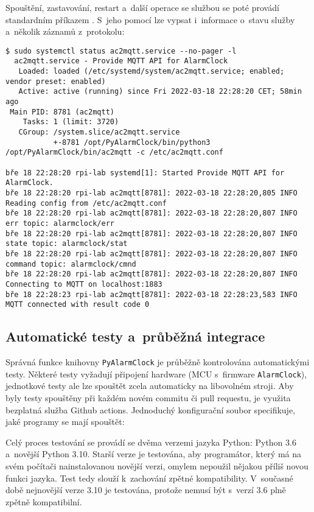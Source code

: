 Spouštění, zastavování, restart a~další operace se službou se poté provádí
standardním příkazem . S~jeho pomocí lze vypsat i~informace
o~stavu služby a~několik záznamů z~protokolu:
\begin{lstlisting}[style=terminal]
$ sudo systemctl status ac2mqtt.service --no-pager -l
  ac2mqtt.service - Provide MQTT API for AlarmClock
   Loaded: loaded (/etc/systemd/system/ac2mqtt.service; enabled; vendor preset: enabled)
   Active: active (running) since Fri 2022-03-18 22:28:20 CET; 58min ago
 Main PID: 8781 (ac2mqtt)
    Tasks: 1 (limit: 3720)
   CGroup: /system.slice/ac2mqtt.service
           +-8781 /opt/PyAlarmClock/bin/python3 /opt/PyAlarmClock/bin/ac2mqtt -c /etc/ac2mqtt.conf

bře 18 22:28:20 rpi-lab systemd[1]: Started Provide MQTT API for AlarmClock.
bře 18 22:28:20 rpi-lab ac2mqtt[8781]: 2022-03-18 22:28:20,805 INFO Reading config from /etc/ac2mqtt.conf
bře 18 22:28:20 rpi-lab ac2mqtt[8781]: 2022-03-18 22:28:20,807 INFO err topic: alarmclock/err
bře 18 22:28:20 rpi-lab ac2mqtt[8781]: 2022-03-18 22:28:20,807 INFO state topic: alarmclock/stat
bře 18 22:28:20 rpi-lab ac2mqtt[8781]: 2022-03-18 22:28:20,807 INFO command topic: alarmclock/cmnd
bře 18 22:28:20 rpi-lab ac2mqtt[8781]: 2022-03-18 22:28:20,807 INFO Connecting to MQTT on localhost:1883
bře 18 22:28:23 rpi-lab ac2mqtt[8781]: 2022-03-18 22:28:23,583 INFO MQTT connected with result code 0
\end{lstlisting}


\subsection{Automatické testy a~průběžná integrace}
Správná funkce knihovny \texttt{PyAlarmClock} je průběžně kontrolována
automatickými testy. Některé testy vyžadují připojení hardware (\acs{MCU}
s~firmware \texttt{AlarmClock}), jednotkové testy ale lze spouštět zcela
automaticky na libovolném stroji. Aby byly testy spouštěny při každém novém
commitu či pull requestu, je využita bezplatná služba Github actions.
Jednoduchý konfigurační soubor  specifikuje,
jaké programy se mají spouštět:

Celý proces testování se provádí se dvěma verzemi jazyka Python: Python 3.6
a~novější Python 3.10. Starší verze je testována, aby programátor, který má na
svém počítači nainstalovanou novější verzi, omylem nepoužil nějakou příliš
novou funkci jazyka. Test tedy slouží k~zachování zpětné kompatibility.
V~současné době nejnovější verze 3.10 je testována, protože nemusí být s~verzí
3.6 plně zpětně kompatibilní.

